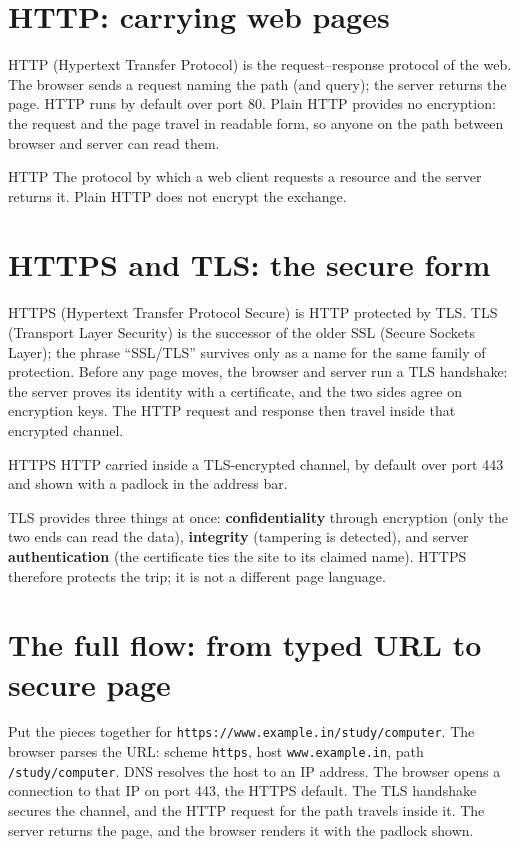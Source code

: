 \section{HTTP: carrying web pages}
HTTP (Hypertext Transfer Protocol) is the request--response protocol of the
web. The browser sends a request naming the path (and query); the server
returns the page. HTTP runs by default over port 80. Plain HTTP provides no
encryption: the request and the page travel in readable form, so anyone on
the path between browser and server can read them.

\begin{definitionbox}{HTTP}
The protocol by which a web client requests a resource and the server
returns it. Plain HTTP does not encrypt the exchange.
\end{definitionbox}

\section{HTTPS and TLS: the secure form}
HTTPS (Hypertext Transfer Protocol Secure) is HTTP protected by TLS. TLS
(Transport Layer Security) is the successor of the older SSL (Secure
Sockets Layer); the phrase ``SSL/TLS'' survives only as a name for the same
family of protection. Before any page moves, the browser and server run a
TLS handshake: the server proves its identity with a certificate, and the
two sides agree on encryption keys. The HTTP request and response then
travel inside that encrypted channel.

\begin{definitionbox}{HTTPS}
HTTP carried inside a TLS-encrypted channel, by default over port 443 and
shown with a padlock in the address bar.
\end{definitionbox}

TLS provides three things at once: \textbf{confidentiality} through
encryption (only the two ends can read the data), \textbf{integrity}
(tampering is detected), and server \textbf{authentication} (the certificate
ties the site to its claimed name). HTTPS therefore protects the trip; it
is not a different page language.

\section{The full flow: from typed URL to secure page}
Put the pieces together for \texttt{https://www.example.in/study/computer}.
The browser parses the URL: scheme \texttt{https}, host
\texttt{www.example.in}, path \texttt{/study/computer}. DNS resolves the
host to an IP address. The browser opens a connection to that IP on port
443, the HTTPS default. The TLS handshake secures the channel, and the HTTP
request for the path travels inside it. The server returns the page, and the
browser renders it with the padlock shown.

